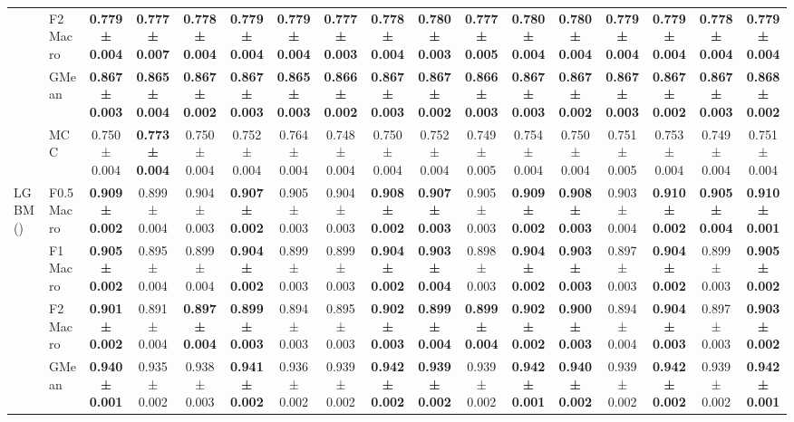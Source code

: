 \begin{table}[H]
{\begin{tabular}{llccccccccccccccc}
 & F2 Macro & \textbf{0.779 ± 0.004} & \textbf{0.777 ± 0.007} & \textbf{0.778 ± 0.004} & \textbf{0.779 ± 0.004} & \textbf{0.779 ± 0.004} & \textbf{0.777 ± 0.003} & \textbf{0.778 ± 0.004} & \textbf{0.780 ± 0.003} & \textbf{0.777 ± 0.005} & \textbf{0.780 ± 0.004} & \textbf{0.780 ± 0.004} & \textbf{0.779 ± 0.004} & \textbf{0.779 ± 0.004} & \textbf{0.778 ± 0.004} & \textbf{0.779 ± 0.004} \\
 & GMean & \textbf{0.867 ± 0.003} & \textbf{0.865 ± 0.004} & \textbf{0.867 ± 0.002} & \textbf{0.867 ± 0.003} & \textbf{0.865 ± 0.003} & \textbf{0.866 ± 0.002} & \textbf{0.867 ± 0.003} & \textbf{0.867 ± 0.002} & \textbf{0.866 ± 0.003} & \textbf{0.867 ± 0.003} & \textbf{0.867 ± 0.002} & \textbf{0.867 ± 0.003} & \textbf{0.867 ± 0.002} & \textbf{0.867 ± 0.003} & \textbf{0.868 ± 0.002} \\
 & MCC & 0.750 ± 0.004 & \textbf{0.773 ± 0.004} & 0.750 ± 0.004 & 0.752 ± 0.004 & 0.764 ± 0.004 & 0.748 ± 0.004 & 0.750 ± 0.004 & 0.752 ± 0.004 & 0.749 ± 0.005 & 0.754 ± 0.004 & 0.750 ± 0.004 & 0.751 ± 0.005 & 0.753 ± 0.004 & 0.749 ± 0.004 & 0.751 ± 0.004 \\
\cline{1-17}
\multirow[t]{5}{*}{LGBM()} & F0.5 Macro & \textbf{0.909 ± 0.002} & 0.899 ± 0.004 & 0.904 ± 0.003 & \textbf{0.907 ± 0.002} & 0.905 ± 0.003 & 0.904 ± 0.003 & \textbf{0.908 ± 0.002} & \textbf{0.907 ± 0.003} & 0.905 ± 0.003 & \textbf{0.909 ± 0.002} & \textbf{0.908 ± 0.003} & 0.903 ± 0.004 & \textbf{0.910 ± 0.002} & \textbf{0.905 ± 0.004} & \textbf{0.910 ± 0.001} \\
 & F1 Macro & \textbf{0.905 ± 0.002} & 0.895 ± 0.004 & 0.899 ± 0.004 & \textbf{0.904 ± 0.002} & 0.899 ± 0.003 & 0.899 ± 0.003 & \textbf{0.904 ± 0.002} & \textbf{0.903 ± 0.004} & 0.898 ± 0.003 & \textbf{0.904 ± 0.002} & \textbf{0.903 ± 0.003} & 0.897 ± 0.003 & \textbf{0.904 ± 0.002} & 0.899 ± 0.003 & \textbf{0.905 ± 0.002} \\
 & F2 Macro & \textbf{0.901 ± 0.002} & 0.891 ± 0.004 & \textbf{0.897 ± 0.004} & \textbf{0.899 ± 0.003} & 0.894 ± 0.003 & 0.895 ± 0.003 & \textbf{0.902 ± 0.003} & \textbf{0.899 ± 0.004} & \textbf{0.899 ± 0.004} & \textbf{0.902 ± 0.002} & \textbf{0.900 ± 0.003} & 0.894 ± 0.004 & \textbf{0.904 ± 0.003} & 0.897 ± 0.003 & \textbf{0.903 ± 0.002} \\
 & GMean & \textbf{0.940 ± 0.001} & 0.935 ± 0.002 & 0.938 ± 0.003 & \textbf{0.941 ± 0.002} & 0.936 ± 0.002 & 0.939 ± 0.002 & \textbf{0.942 ± 0.002} & \textbf{0.939 ± 0.002} & 0.939 ± 0.002 & \textbf{0.942 ± 0.001} & \textbf{0.940 ± 0.002} & 0.939 ± 0.002 & \textbf{0.942 ± 0.002} & 0.939 ± 0.002 & \textbf{0.942 ± 0.001} \\

\end{tabular}}
\end{table}
